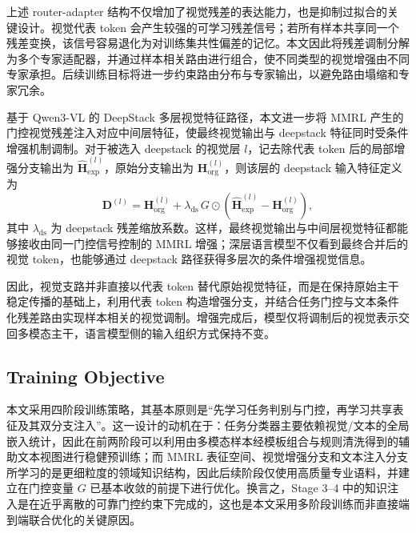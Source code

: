 \documentclass[journal]{IEEEtran}
\begin{document}
上述 router-adapter 结构不仅增加了视觉残差的表达能力，也是抑制过拟合的关键设计。视觉代表 token 会产生较强的可学习残差信号；若所有样本共享同一个残差变换，该信号容易退化为对训练集共性偏差的记忆。本文因此将残差调制分解为多个专家适配器，并通过样本相关路由进行组合，使不同类型的视觉增强由不同专家承担。后续训练目标将进一步约束路由分布与专家输出，以避免路由塌缩和专家冗余。\cite{fedus2022switch}

基于 Qwen3-VL 的 DeepStack 多层视觉特征路径，本文进一步将 MMRL 产生的门控视觉残差注入对应中间层特征，使最终视觉输出与 deepstack 特征同时受条件增强机制调制。对于被选入 deepstack 的视觉层 $l$，记去除代表 token 后的局部增强分支输出为 $\hat{\mathbf{H}}_{\mathrm{exp}}^{(l)}$，原始分支输出为 $\mathbf{H}_{\mathrm{org}}^{(l)}$，则该层的 deepstack 输入特征定义为
\begin{equation}
\mathbf{D}^{(l)}
=
\mathbf{H}_{\mathrm{org}}^{(l)}
+
\lambda_{\mathrm{ds}}\,
G\odot
\left(
\hat{\mathbf{H}}_{\mathrm{exp}}^{(l)}
-
\mathbf{H}_{\mathrm{org}}^{(l)}
\right),
\end{equation}
其中 $\lambda_{\mathrm{ds}}$ 为 deepstack 残差缩放系数。这样，最终视觉输出与中间层视觉特征都能够接收由同一门控信号控制的 MMRL 增强；深层语言模型不仅看到最终合并后的视觉 token，也能够通过 deepstack 路径获得多层次的条件增强视觉信息。

因此，视觉支路并非直接以代表 token 替代原始视觉特征，而是在保持原始主干稳定传播的基础上，利用代表 token 构造增强分支，并结合任务门控与文本条件化残差路由实现样本相关的视觉调制。增强完成后，模型仅将调制后的视觉表示交回多模态主干，语言模型侧的输入组织方式保持不变。




















\subsection{Training Objective}
\label{sec:training_objective}

本文采用四阶段训练策略，其基本原则是“先学习任务判别与门控，再学习共享表征及其双分支注入”。这一设计的动机在于：任务分类器主要依赖视觉/文本的全局嵌入统计，因此在前两阶段可以利用由多模态样本经模板组合与规则清洗得到的辅助文本视图进行稳健预训练；而 MMRL 表征空间、视觉增强分支和文本注入分支所学习的是更细粒度的领域知识结构，因此后续阶段仅使用高质量专业语料，并建立在门控变量 $G$ 已基本收敛的前提下进行优化。换言之，Stage 3--4 中的知识注入是在近乎离散的可靠门控约束下完成的，这也是本文采用多阶段训练而非直接端到端联合优化的关键原因。
\end{document}
